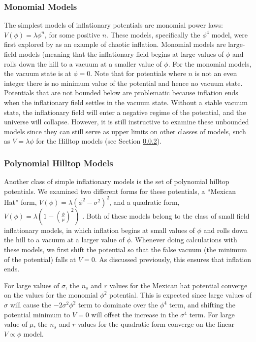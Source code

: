 \documentclass[a4paper,11pt]{article}
\begin{document}
\subsubsection{Monomial Models}
\label{sssec:Mono}
The simplest models of inflationary potentials are monomial power laws: $V(\phi)=\lambda\phi^n$, for some positive $n$. These models, specifically the $\phi^4$ model, were first explored by \citet{Linde1983} as an example of chaotic inflation. Monomial models are large-field models (meaning that the inflationary field begins at large values of $\phi$ and rolls down the hill to a vacuum at a smaller value of $\phi$. For the monomial models, the vacuum state is at $\phi=0$. Note that for potentials where $n$ is not an even integer there is no minimum value of the potential and hence no vacuum state. Potentials that are not bounded below are problematic because inflation ends when the inflationary field settles in the vacuum state. Without a stable vacuum state, the inflationary field will enter a negative regime of the potential, and the universe will collapse. However, it is still instructive to examine these unbounded models since they can still serve as upper limits on other classes of models, such as $V=\lambda\phi$ for the Hilltop models (see Section \ref{sssec:Hilltop}).

\subsubsection{Polynomial Hilltop Models}
\label{sssec:Hilltop}
Another class of simple inflationary models is the set of polynomial hilltop potentials. We examined two different forms for these potentials, a ``Mexican Hat'' form, $V(\phi)=\lambda(\phi^2-\sigma^2)^2$, and a quadratic form, $V(\phi)=\lambda(1-(\tfrac{\phi}{\mu})^2)$ \citep{Boubekeur+Lyth2005}. Both of these models belong to the class of small field inflationary models, in which inflation begins at small values of $\phi$ and rolls down the hill to a vacuum at a larger value of $\phi$. Whenever doing calculations with these models, we first shift the potential so that the false vacuum (the minimum of the potential) falls at $V=0$. As discussed previously, this ensures that inflation ends. 

For large values of $\sigma$, the $n_s$ and $r$ values for the Mexican hat potential converge on the values for the monomial $\phi^2$ potential. This is expected since large values of $\sigma$ will cause the $-2\sigma^2\phi^2$ term to dominate over the $\phi^4$ term, and shifting the potential minimum to $V=0$ will offset the increase in the $\sigma^4$ term. For large value of $\mu$, the $n_s$ and $r$ values for the quadratic form converge on the linear $V\propto \phi$ model. 
\end{document}

